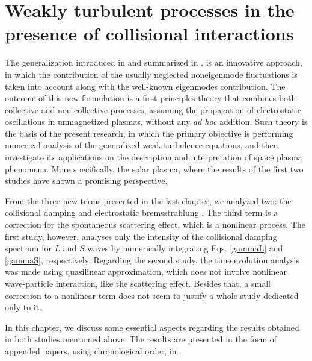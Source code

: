 \documentclass[12pt,a4paper,ruledheader]{report}
\begin{document}
\chapter{Weakly turbulent processes in the presence of
  collisional interactions}
\label{main}
The generalization introduced in \cite{YZKS16} and summarized in
, is an innovative approach, in which the contribution
of the usually neglected noneigenmode fluctuations is taken into account
along with the well-known eigenmodes contribution. The outcome of this new
formulation is a first principles theory that combines both collective
and non-collective processes, assuming the propagation of electrostatic
oscillations in unmagnetized plasmas, without any \emph{ad hoc} addition.
Such theory is the basis of the present research, in which the
primary objective
is performing numerical analysis of the generalized weak turbulence equations,
and then investigate its applications on the description and interpretation
of space plasma phenomena. More specifically, the solar plasma, where the
results of the first two studies \cite{Tigik2016b,Tigik2017a} have shown a
promising perspective. 

From the three new terms presented in the last chapter, we analyzed two:
the collisional damping \cite{Tigik2016b} and electrostatic bremsstrahlung
\cite{Tigik2017a}. The third term is a correction for the spontaneous
scattering effect, which is a nonlinear process. The first study, however,
analyses only the intensity of the collisional damping spectrum for $L$ and
$S$ waves by numerically integrating Eqs. \eqref{gammaL} and \eqref{gammaS},
respectively. Regarding the second study, the time evolution analysis was
made using quasilinear approximation, which does not involve nonlinear
wave-particle interaction, like the scattering effect. Besides that, a
small correction to a nonlinear term does not seem to justify a whole study
dedicated only to it.

In this chapter, we discuss some essential aspects regarding the results
obtained in both studies mentioned above. The results are presented in the
form of appended papers, using chronological order, in .
\end{document}
